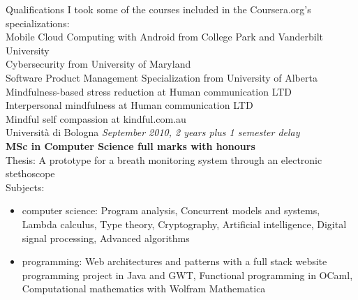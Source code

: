 \documentclass{resume}
\begin{document}
  \begin{rSection}{Qualifications} 
    I took some of the courses included in the Coursera.org's  specializations:\\
    Mobile Cloud Computing with Android from College Park and Vanderbilt University\\
    Cybersecurity from University of Maryland\\
    Software Product Management Specialization from University of Alberta\\

    Mindfulness-based stress reduction at Human communication LTD\\
    Interpersonal mindfulness at Human communication LTD\\
    Mindful self compassion at kindful.com.au\\


    Universit\`a di Bologna \hfill {\em September 2010, 2 years plus 1 semester delay} \\
    {\bf MSc in Computer Science full marks with honours}\\
    Thesis: A prototype for a breath monitoring system through an electronic stethoscope\\
    Subjects:
    \begin{itemize}
      \item computer science: 
        Program analysis, Concurrent models and systems, Lambda calculus,
	    Type theory, Cryptography, Artificial intelligence, Digital signal processing,
	    Advanced algorithms
      \item programming: Web architectures and patterns with a full stack website programming project in Java and GWT, 
	    Functional programming in OCaml, Computational mathematics with Wolfram Mathematica\\
    \end{itemize}
 


\end{rSection}
\end{document}
